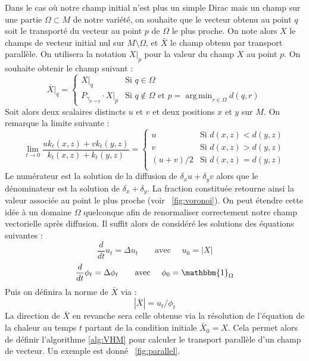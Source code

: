 \documentclass[11pt]{article}
\newcommand{\syst}[2]{\left\{ \begin{array}{#1} #2 \end{array} \right.}
\DeclareMathOperator*{\argmin}{arg\,min}
\begin{document}
	Dans le cas où notre champ initial n'est plus un simple Dirac mais un champ sur une partie $\Omega \subset M$ de notre variété, on souhaite que le vecteur obtenu au point $q$ soit le transporté du vecteur au point $p$ de $\Omega$ le plus proche. On note alors $X$ le champs de vecteur initial nul sur $M \setminus \Omega$, et $\bar{X}$ le champ obtenu par transport parallèle. On utilisera la notation $X|_p$ pour la valeur du champ $X$ au point $p$. On souhaite obtenir le champ suivant :
	$$ \bar{X}|_q = \syst{ll}{
		X|_q & \text{Si } q \in \Omega \\
		P_{\gamma_{p \rightarrow q}} \cdot X|_p & \text{Si } q \notin \Omega \text{ et } p = \argmin_{r \in \Omega} d(q, r)
	} $$
	Soit alors deux scalaires distincts $u$ et $v$ et deux positions $x$ et $y$ sur $M$. On remarque la limite suivante :
	$$ \lim_{t \rightarrow 0} \frac{u k_t(x, z) + v k_t(y, z)}{k_t(x, z) + k_t(y, z)} = \syst{ll}{
		u & \text{Si } d(x, z) < d(y, z) \\
		v & \text{Si } d(x, z) > d(y, z) \\
		(u+v) / 2 & \text{Si } d(x, z) = d(y, z) \\
	} $$
	Le numérateur est la solution de la diffusion de $\delta_x u + \delta_y v$ alors que le dénominateur est la solution de $\delta_x + \delta_y$. La fraction constituée retourne ainsi la valeur associée au point le plus proche (voir \figurename~\ref{fig:voronoi}). On peut étendre cette idée à un domaine $\Omega$ quelconque afin de renormaliser correctement notre champ vectorielle après diffusion. Il suffit alors de considéré les solutions des équations suivantes :
	$$ \frac{d}{dt} u_t = \Delta u_t \qquad \text{avec } \quad u_0 = | X | $$
	$$ \frac{d}{dt} \phi_t = \Delta \phi_t \qquad \text{avec } \quad \phi_0 = \mathbbm{1}_\Omega $$
	Puis on définira la norme de $\bar{X}$ via :
	$$ | \bar{X} | = u_t / \phi_t $$
	La direction de $\bar{X}$ en revanche sera celle obtenue via la résolution de l'équation de la chaleur au temps $t$ partant de la condition initiale $\bar{X}_0 = X$. Cela permet alors de définir l'algorithme \ref{alg:VHM} pour calculer le transport parallèle d'un champ de vecteur. Un exemple est donné \figurename~\ref{fig:parallel}.
	
\end{document}
